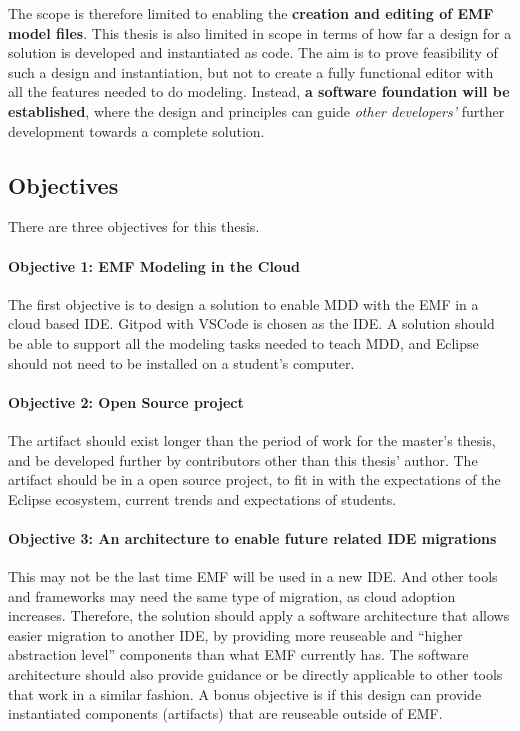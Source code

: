 The scope is therefore limited to enabling the \textbf{creation and editing of  \acrshort{EMF} model files}.
This thesis is also limited in scope in terms of how far a design for a solution is developed and instantiated as code.
The aim is to prove feasibility of such a design and instantiation, but not to create a fully functional editor with all the features needed to do modeling.
Instead, \textbf{a software foundation will be established}, where the design and principles can guide \textit{other developers'} further development towards a complete solution.

\subsection{Objectives}

There are three objectives for this thesis.

\paragraph{Objective 1: EMF Modeling in the Cloud}
The first objective is to design a solution to enable \acrfull{MDD} with the \acrfull{EMF} in a cloud based \acrshort{IDE}.
\Gls{Gitpod} with \gls{VSCode} is chosen as the \acrshort{IDE}.
A solution should be able to support all the modeling tasks needed to teach \acrshort{MDD}, and \gls{Eclipse} should not need to be installed on a student's computer.

\paragraph{Objective 2: Open Source project}
The artifact should exist longer than the period of work for the master's thesis, and be developed further by contributors other than this thesis' author.
The artifact should be in a \gls{open source} project, to fit in with the expectations of the Eclipse ecosystem, current trends and expectations of students.

\paragraph{Objective 3: An architecture to enable future related IDE migrations}
This may not be the last time \acrshort{EMF} will be used in a new \acrshort{IDE}.
And other tools and frameworks may need the same type of migration, as \gls{cloud} adoption increases.
Therefore, the solution should apply a software architecture that allows easier migration to another \acrshort{IDE}, by providing more reuseable and ``higher abstraction level'' components than what \acrshort{EMF} currently has.
The software architecture should also provide guidance or be directly applicable to other tools that work in a similar fashion.
A bonus objective is if this design can provide instantiated components (artifacts) that are reuseable outside of \acrshort{EMF}.

